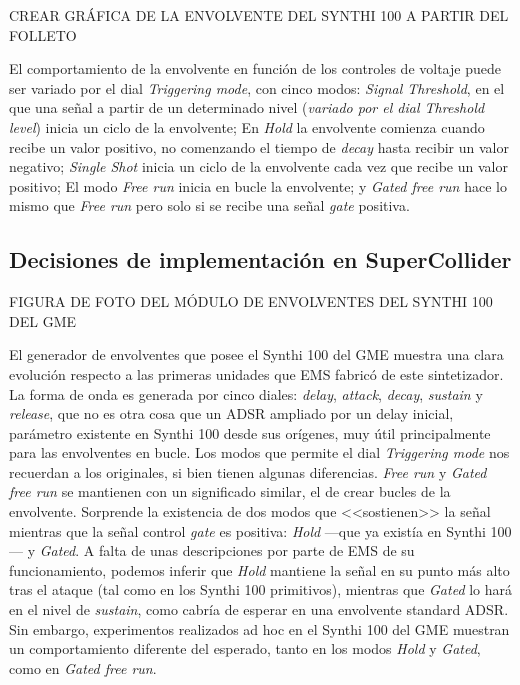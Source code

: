 CREAR GRÁFICA DE LA ENVOLVENTE DEL SYNTHI 100 A PARTIR DEL FOLLETO

El comportamiento de la envolvente en función de los controles de voltaje puede ser variado por el dial \textit{Triggering mode}, con cinco modos: \textit{Signal Threshold}, en el que una señal a partir de un determinado nivel (\textit{variado por el dial \textit{Threshold level}}) inicia un ciclo de la envolvente; En \textit{Hold} la envolvente comienza cuando recibe un valor positivo, no comenzando el tiempo de \textit{decay} hasta recibir un valor negativo;  \textit{Single Shot} inicia un ciclo de la envolvente cada vez que recibe un valor positivo; El modo \textit{Free run} inicia en bucle la envolvente; y \textit{Gated free run} hace lo mismo que \textit{Free run} pero solo si se recibe una señal \textit{gate} positiva.

\subsection{Decisiones de implementación en SuperCollider}


FIGURA DE FOTO DEL MÓDULO DE ENVOLVENTES DEL SYNTHI 100 DEL GME

El generador de envolventes que posee el Synthi 100 del GME muestra una clara evolución respecto a las primeras unidades que EMS fabricó de este sintetizador. La forma de onda es generada por cinco diales: \textit{delay}, \textit{attack}, \textit{decay}, \textit{sustain} y \textit{release}, que no es otra cosa que un ADSR ampliado por un delay inicial, parámetro existente en Synthi 100 desde sus orígenes, muy útil principalmente para las envolventes en bucle. Los modos que permite el dial \textit{Triggering mode} nos recuerdan a los originales, si bien tienen algunas diferencias. \textit{Free run} y \textit{Gated free run} se mantienen con un significado similar, el de crear bucles de la envolvente. Sorprende la existencia de dos modos que <<sostienen>> la señal mientras que la señal control \textit{gate} es positiva: \textit{Hold} ---que ya existía en Synthi 100--- y \textit{Gated}. A falta de unas descripciones por parte de EMS de su funcionamiento, podemos inferir que \textit{Hold} mantiene la señal en su punto más alto tras el ataque (tal como en los Synthi 100 primitivos), mientras que \textit{Gated} lo hará en el nivel de \textit{sustain}, como cabría de esperar en una envolvente standard ADSR. Sin embargo, experimentos realizados ad hoc en el Synthi 100 del GME muestran un comportamiento diferente del esperado, tanto en los modos \textit{Hold} y \textit{Gated}, como en \textit{Gated free run}.

